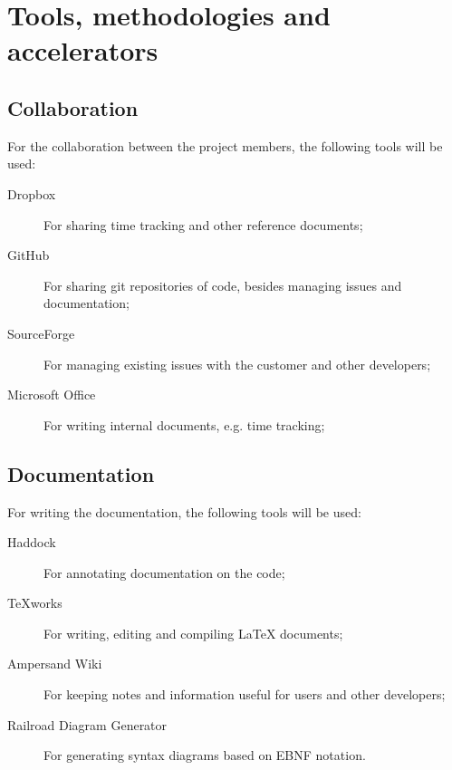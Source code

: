 \section{Tools, methodologies and accelerators}
\label{sec:tools-methodologies}

\subsection{Collaboration}
%
%
%
%
For the collaboration between the project members, the following tools will be used:
\begin{description}
	\item[Dropbox] For sharing time tracking and other reference documents;
	\item[GitHub] For sharing git repositories of code, besides managing issues and documentation;
	\item[SourceForge] For managing existing issues with the customer and other developers;
	\item[Microsoft Office] For writing internal documents, e.g. time tracking;
\end{description}

\subsection{Documentation}
%
%
%
%
%
%
%
For writing the documentation, the following tools will be used:
\begin{description}
	\item[Haddock] For annotating documentation on the code;
	\item[TeXworks] For writing, editing and compiling \LaTeX{} documents;
	\item[Ampersand Wiki] For keeping notes and information useful for users and other developers;
	\item[Railroad Diagram Generator] For generating syntax diagrams based on EBNF notation.
\end{description}

